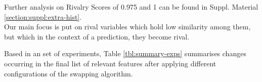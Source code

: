 Further analysis on Rivalry Scores of 0.975 and 1 can be found in Suppl. Material \ref{section:suppl:extra-hist}.
\\

Our main focus is put on rival variables which hold low similarity among them, but which in the context of a prediction, they become rival.

Based in an set of experiments, Table \ref{tbl:summary-exps} summarises changes occurring in the final list of relevant features after applying different configurations of the swapping algorithm.
\\

\begin{table}[!h]
\centering
{}
\caption{Rank changes on different parameters of swapper results. \emph{Quasi-constant index} (QLOI) indicates the percentage of values different from the feature's mode minimum required (0.1 = 10\%). \emph{Rank changed} depicts how many nodes have changed their rank in the list, according to the new relations. Some features have entered the old top298 group which hold more than 8 votes, therefore the result set increases and some features are re-ranked gaining relevance.}
\label{tbl:summary-exps}
\end{table}